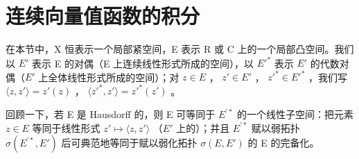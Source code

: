 \section{连续向量值函数的积分}

在本节中，X 恒表示一个局部紧空间，E 表示 R 或 C 上的一个局部凸空间。我们以 \(E'\) 表示 E 的对偶（E 上连续线性形式所成的空间），以 \(E'^{*}\) 表示 \(E'\) 的代数对偶（\(E'\) 上全体线性形式所成的空间）；对 \(z \in E\) ， \(z' \in E'\) ， \(z'^{*} \in E'^{*}\) ，我们写 \(\langle z, z' \rangle = z'(z)\) ， \(\langle z'^{*}, z' \rangle = z'^{*}(z')\) 。

回顾一下，若 E 是 Hausdorff 的，则 E 可等同于 \(E^{\prime*}\) 的一个线性子空间：把元素 \(z \in E\) 等同于线性形式 \(z' \mapsto \langle z, z' \rangle\) （\(E'\) 上的）；并且 \(E^{\prime*}\) 赋以弱拓扑 \(\sigma(E^{\prime*}, E')\) 后可典范地等同于赋以弱化拓扑 \(\sigma(E, E')\) 的 E 的完备化。


